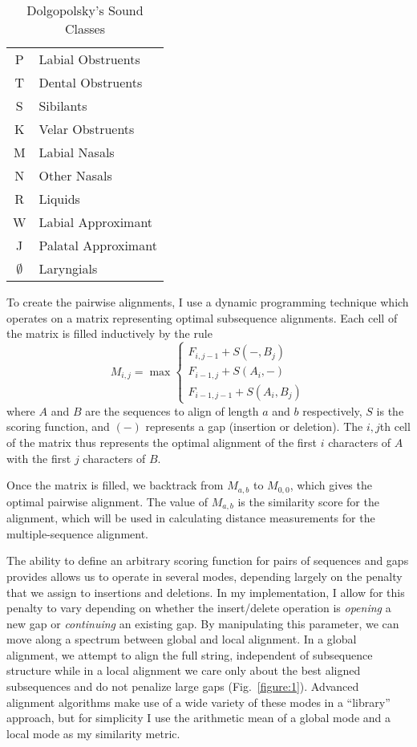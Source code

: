 \documentclass[doc,natbib,11pt]{apa6}
\begin{document}
\begin{table}[b]
	\begin{tabular}{|cl}
		P & Labial Obstruents\\
		T & Dental Obstruents\\
		S & Sibilants\\
		K & Velar Obstruents\\
		M & Labial Nasals\\
		N & Other Nasals\\
		R & Liquids \\
		W & Labial Approximant\\
		J &  Palatal Approximant\\
		$\emptyset$ & Laryngials 
	\end{tabular}
	\caption{Dolgopolsky's Sound Classes}
\end{table}

To create the pairwise alignments, I use a dynamic programming technique which operates on a matrix representing optimal subsequence alignments. Each cell of the matrix is filled inductively by the rule 
\begin{equation}
M_{i,j} = \max\begin{cases}
F_{i,j-1} + S(-, B_j)\\
F_{i-1,j} + S(A_i, -)\\
F_{i-1, j-1} + S(A_i, B_j)
\end{cases}
\end{equation}
where $A$ and $B$ are the sequences to align of length $a$ and $b$ respectively, $S$ is the scoring function, and $(-)$ represents a gap (insertion or deletion). The $i,j$th cell of the matrix thus represents the optimal alignment of the first $i$ characters of $A$ with the first $j$ characters of $B$.

Once the matrix is filled, we backtrack from $M_{a,b}$ to $M_{0,0}$, which gives the optimal pairwise alignment. The value of $M_{a,b}$ is the similarity score for the alignment, which will be used in calculating distance measurements for the multiple-sequence alignment. 

The ability to define an arbitrary scoring function for pairs of sequences and gaps provides allows us to operate in several modes, depending largely on the penalty that we assign to insertions and deletions. In my implementation, I allow for this penalty to vary depending on whether the insert/delete operation is \emph{opening} a new gap or \emph{continuing} an existing gap. By manipulating this parameter, we can move along a spectrum between global and local alignment. In a global alignment, we attempt to align the full string, independent of subsequence structure while in a local alignment we care only about the best aligned subsequences and do not penalize large gaps (Fig.~\ref{figure:1}). Advanced alignment algorithms make use of a wide variety of these modes in a ``library'' approach, but for simplicity I use the arithmetic mean of a global mode and a local mode as my similarity metric.
\end{document}
